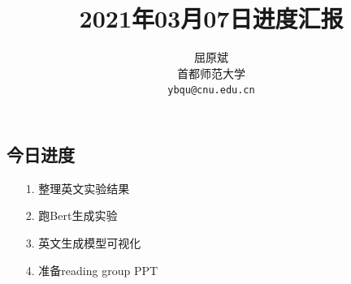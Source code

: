 \documentclass[11pt]{article}
\title{2021年03月07日进度汇报}
\author{屈原斌 \\
  首都师范大学 \\
    {\tt ybqu@cnu.edu.cn}}
\date{}
\begin{document}
\begin{CJK}{UTF8}{gkai}

\maketitle
\CJKindent


\section{今日进度}


\begin{itemize}
\item [1.] 整理英文实验结果
\item [2.] 跑Bert生成实验
\item [3.] 英文生成模型可视化
\item [4.] 准备reading group PPT
\end{itemize}


\end{CJK}
\end{document}

